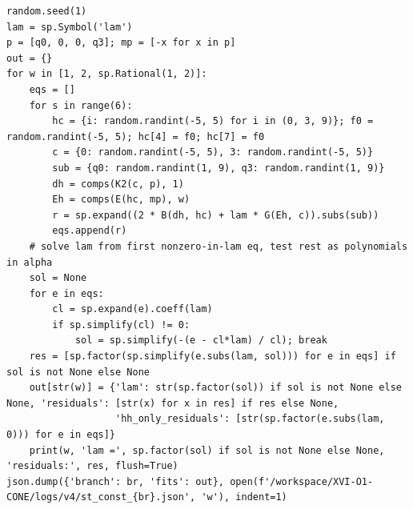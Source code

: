 \documentclass[10pt]{article}
\begin{document}
\begin{lstlisting}
random.seed(1)
lam = sp.Symbol('lam')
p = [q0, 0, 0, q3]; mp = [-x for x in p]
out = {}
for w in [1, 2, sp.Rational(1, 2)]:
    eqs = []
    for s in range(6):
        hc = {i: random.randint(-5, 5) for i in (0, 3, 9)}; f0 = random.randint(-5, 5); hc[4] = f0; hc[7] = f0
        c = {0: random.randint(-5, 5), 3: random.randint(-5, 5)}
        sub = {q0: random.randint(1, 9), q3: random.randint(1, 9)}
        dh = comps(K2(c, p), 1)
        Eh = comps(E(hc, mp), w)
        r = sp.expand((2 * B(dh, hc) + lam * G(Eh, c)).subs(sub))
        eqs.append(r)
    # solve lam from first nonzero-in-lam eq, test rest as polynomials in alpha
    sol = None
    for e in eqs:
        cl = sp.expand(e).coeff(lam)
        if sp.simplify(cl) != 0:
            sol = sp.simplify(-(e - cl*lam) / cl); break
    res = [sp.factor(sp.simplify(e.subs(lam, sol))) for e in eqs] if sol is not None else None
    out[str(w)] = {'lam': str(sp.factor(sol)) if sol is not None else None, 'residuals': [str(x) for x in res] if res else None,
                   'hh_only_residuals': [str(sp.factor(e.subs(lam, 0))) for e in eqs]}
    print(w, 'lam =', sp.factor(sol) if sol is not None else None, 'residuals:', res, flush=True)
json.dump({'branch': br, 'fits': out}, open(f'/workspace/XVI-O1-CONE/logs/v4/st_const_{br}.json', 'w'), indent=1)
\end{lstlisting}
\end{document}
